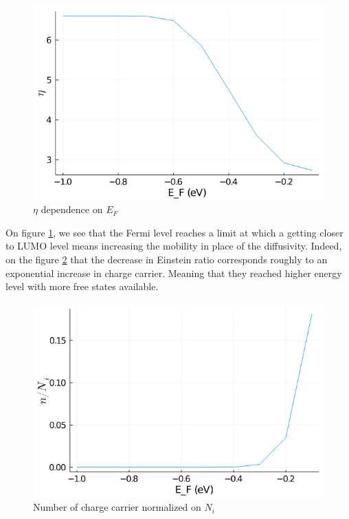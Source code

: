 \begin{figure}[!h]
    \centering
    \includegraphics*[width=.5\paperwidth]{figures/3_elec/ein_fermi.png}
    \caption{$\eta$ dependence on $E_F$ \label{fig:3_23}}
\end{figure}

On figure \ref{fig:3_23}, we see that the Fermi level reaches a limit at which a getting closer to LUMO level means increasing the mobility in place of the diffusivity. Indeed, on the figure \ref{fig:3_24} that the decrease in Einstein ratio corresponds roughly to an exponential increase in charge carrier. Meaning that they reached higher energy level with more free states available.

\begin{figure}[!h]
    \centering
    \includegraphics*[width=.5\paperwidth]{figures/3_elec/charge_fermi.png}
    \caption{Number of charge carrier normalized on $N_i$ \label{fig:3_24}}
\end{figure}

